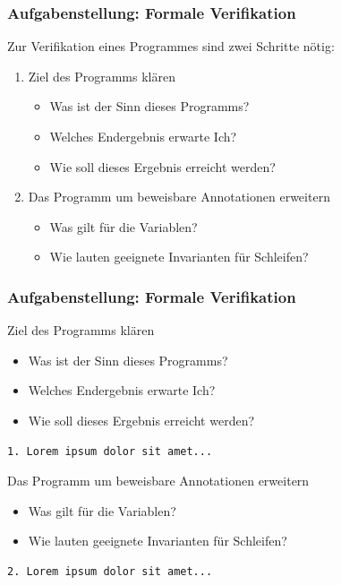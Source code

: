 \documentclass{beamer}
\begin{document}
\begin{frame}
\frametitle{Aufgabenstellung: Formale Verifikation}
Zur Verifikation eines Programmes sind zwei Schritte nötig:
    \begin{enumerate}
    \item<+-> Ziel des Programms kl\"aren
    \begin{itemize}
        \item Was ist der Sinn dieses Programms?
        \item Welches Endergebnis erwarte Ich?
        \item Wie soll dieses Ergebnis erreicht werden?
    \end{itemize}
    \item<+- | visible> Das Programm um beweisbare Annotationen erweitern
    \begin{itemize}
        \item Was gilt für die Variablen?
        \item Wie lauten geeignete Invarianten für Schleifen?
        \end{itemize}
    \end{enumerate}
\end{frame}

\begin{frame}[fragile]
\frametitle{Aufgabenstellung: Formale Verifikation}
\begin{enumerate}
\centering
\begin{overprint}[308pt]
\item Ziel des Programms kl\"aren
\begin{itemize}
\item Was ist der Sinn dieses Programms?
\item Welches Endergebnis erwarte Ich?
\item Wie soll dieses Ergebnis erreicht werden?
\end{itemize}
\begin{verbatim}
1. Lorem ipsum dolor sit amet...
\end{verbatim}
\item Das Programm um beweisbare Annotationen erweitern
\begin{itemize}
\item Was gilt für die Variablen?
\item Wie lauten geeignete Invarianten für Schleifen?
\end{itemize}
\begin{verbatim}
2. Lorem ipsum dolor sit amet...
\end{verbatim}
\end{overprint}
\end{enumerate}
\end{frame}
\end{document}
